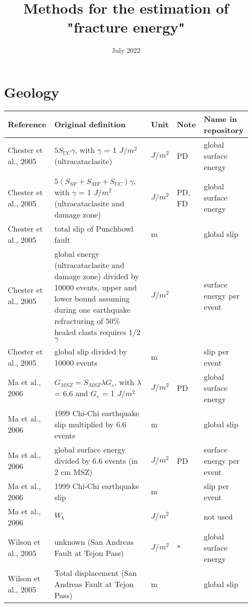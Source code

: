 \documentclass{article}
\title{Methods for the estimation of "fracture energy"}
\date{July 2022}
\begin{document}
\maketitle

\section{Geology}
\begin{longtable}{|p{4 cm}|p{8 cm}|p{1.25 cm}|p{1.25 cm}|p{1.5 cm}|}
\hline
\textbf{Reference} & \textbf{Original definition} & \textbf{Unit} & \textbf{Note} & \textbf{Name in repository} \\ \hline
Chester et al., 2005 & \( \displaystyle 5 S_{UC} \gamma \), with $\gamma$ = 1 $J/m^2$ (ultracataclasite) & $J/m^2$ & PD & global surface energy \\
Chester et al., 2005 & \( \displaystyle 5(S_{SF}+S_{MF}+S_{UC}) \gamma \), with $\gamma$ = 1 $J/m^2$ (ultracataclasite and damage zone) & $J/m^2$ & PD, FD & global surface energy \\
Chester et al., 2005 & total slip of Punchbowl fault & m & & global slip \\
Chester et al., 2005 & global energy (ultracataclasite and damage zone) divided by 10000 events, upper and lower bound assuming during one earthquake refracturing of 50\% healed clasts requires 1/2 $\gamma$ & $J/m^2$ & & surface energy per event \\
Chester et al., 2005 & global slip divided by 10000 events & m & & slip per event \\
Ma et al., 2006 & \( \displaystyle  G_{MSZ} = S_{MSZ} \lambda G_c \), with $\lambda$ = 6.6 and $G_c$ = 1 $J/m^2$ & $J/m^2$ & PD & global surface energy \\
Ma et al., 2006 & 1999 Chi-Chi earthquake slip multiplied by 6.6 events & m & & global slip \\
Ma et al., 2006 & global surface energy divided by 6.6 events (in 2 cm MSZ) & $J/m^2$ & PD & surface energy per event \\
Ma et al., 2006 & 1999 Chi-Chi earthquake slip & m & & slip per event \\
Ma et al., 2006 & \( \displaystyle W_b \) & $J/m^2$ & & not used \\
Wilson et al., 2005 & unknown (San Andreas Fault at Tejon Pass) & $J/m^2$ & * & global surface energy \\
Wilson et al., 2005 & Total displacement (San Andreas Fault at Tejon Pass) & m & & global slip \\

\end{longtable}
\end{document}

